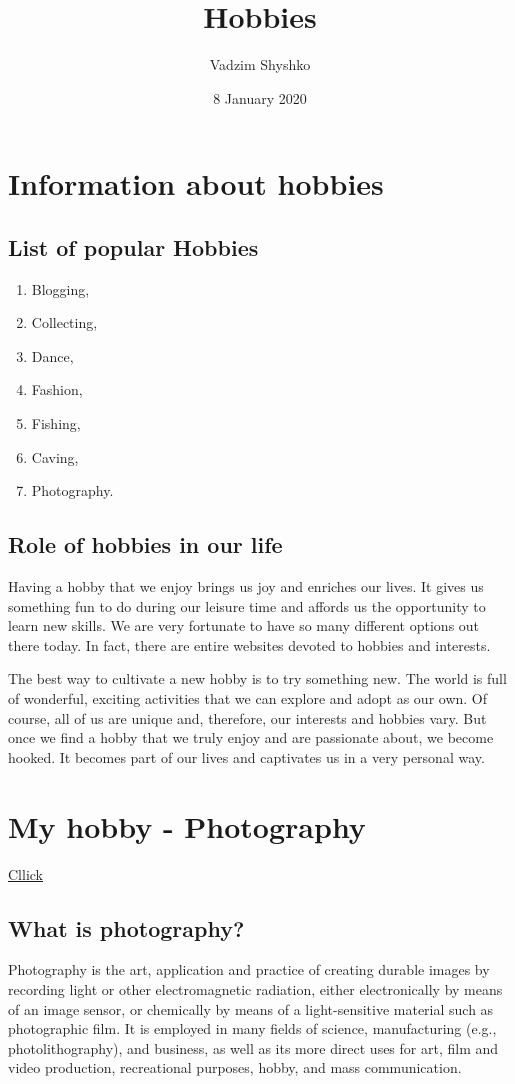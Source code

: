 \documentclass{article}
\title{Hobbies}
\author{Vadzim Shyshko }
\date{8 January 2020}
\begin{document}
\maketitle

\tableofcontents
\listoffigures
\listoftables
\newpage
\section{Information about hobbies}
\subsection{List of popular Hobbies}

\begin{enumerate}
\item Blogging,
\item Collecting,
\item Dance,
\item Fashion,
\item Fishing,
\item Caving,
\item Photography.
\end{enumerate}

\subsection{Role of hobbies in our life}
Having a hobby that we enjoy brings us joy and enriches our lives. It gives us something fun to do during our leisure time and affords us the opportunity to learn new skills. We are very fortunate to have so many different options out there today. In fact, there are entire websites devoted to hobbies and interests.

The best way to cultivate a new hobby is to try something new. The world is full of wonderful, exciting activities that we can explore and adopt as our own. Of course, all of us are unique and, therefore, our interests and hobbies vary. But once we find a hobby that we truly enjoy and are passionate about, we become hooked. It becomes part of our lives and captivates us in a very personal way.

\section{My hobby - Photography}   
\href{https://en.wikipedia.org/wiki/Photography}{Cllick}

\subsection{What is photography?}
Photography is the art, application and practice of creating durable images by recording light or other electromagnetic radiation, either electronically by means of an image sensor, or chemically by means of a light-sensitive material such as photographic film. It is employed in many fields of science, manufacturing (e.g., photolithography), and business, as well as its more direct uses for art, film and video production, recreational purposes, hobby, and mass communication.
\end{document}
